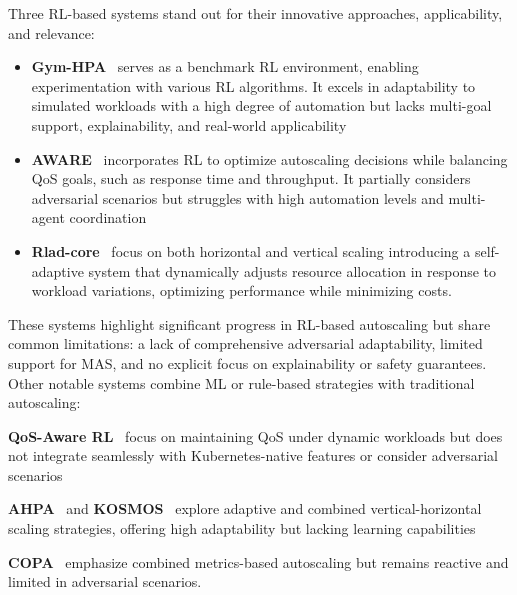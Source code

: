 Three RL-based systems stand out for their innovative approaches, applicability, and relevance:
%
\begin{itemize}
  \item \textbf{Gym-HPA}~\cite{gymhpa2022} serves as a benchmark RL environment, enabling experimentation with various RL algorithms. It excels in adaptability to simulated workloads with a high degree of automation but lacks multi-goal support, explainability, and real-world applicability
  \item \textbf{AWARE}~\cite{aware2023} incorporates RL to optimize autoscaling decisions while balancing QoS goals, such as response time and throughput. It partially considers adversarial scenarios but struggles with high automation levels and multi-agent coordination
  \item \textbf{Rlad-core}~\cite{Rossi2019} focus on both horizontal and vertical scaling introducing a self-adaptive system that dynamically adjusts resource allocation in response to workload variations, optimizing performance while minimizing costs.
\end{itemize}

These systems highlight significant progress in RL-based autoscaling but share common limitations: a lack of comprehensive adversarial adaptability, limited support for MAS, and no explicit focus on explainability or safety guarantees.
%
Other notable systems combine ML or rule-based strategies with traditional autoscaling:
%
\begin{enumerate*}[label={}, itemjoin={;\quad }]
  \item \textbf{QoS-Aware RL}~\cite{QoSRL} focus on maintaining QoS under dynamic workloads but does not integrate seamlessly with Kubernetes-native features or consider adversarial scenarios
  \item \textbf{AHPA}~\cite{Zhou2024} and \textbf{KOSMOS}~\cite{KOSMOS} explore adaptive and combined vertical-horizontal scaling strategies, offering high adaptability but lacking learning capabilities
  \item \textbf{COPA}~\cite{COPA} emphasize combined metrics-based autoscaling but remains reactive and limited in adversarial scenarios.
\end{enumerate*}


